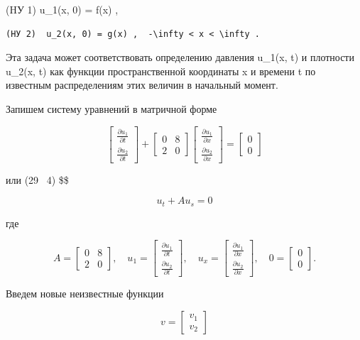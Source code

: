 \documentclass[
  ukrainian,
]{article}
\begin{document}
(HУ 1) u\_1(x, 0) = f(x) ,

\begin{verbatim}
(HУ 2)  u_2(x, 0) = g(x) ,  -\infty < x < \infty .
\end{verbatim}

Эта задача может соответствовать определению давления u\_1(x, t) и
плотности u\_2(x, t) как функции пространственной координаты x и времени
t по известным распределениям этих величин в начальный момент.

Запишем систему уравнений в матричной форме

\[
\begin{bmatrix} \frac{\partial u_1}{\partial t} \\ \frac{\partial u_2}{\partial t} \end{bmatrix} + \begin{bmatrix} 0 & 8 \\ 2 & 0 \end{bmatrix} \begin{bmatrix} \frac{\partial u_1}{\partial x} \\ \frac{\partial u_2}{\partial x} \end{bmatrix} = \begin{bmatrix} 0 \\ 0 \end{bmatrix}
\]

или (29 ~4) \$\$

\[
u_t + Au_s = 0
\]

где

\[
A = \begin{bmatrix} 0 & 8 \\ 2 & 0 \end{bmatrix}, \quad u_1 = \begin{bmatrix} \frac{\partial u_1}{\partial t} \\ \frac{\partial u_2}{\partial t} \end{bmatrix}, \quad u_x = \begin{bmatrix} \frac{\partial u_1}{\partial x} \\ \frac{\partial u_2}{\partial x} \end{bmatrix}, \quad 0 = \begin{bmatrix} 0 \\ 0 \end{bmatrix}.
\]

Введем новые неизвестные функции

\[
v = \begin{bmatrix} v_1 \\ v_2 \end{bmatrix}
\]
\end{document}

